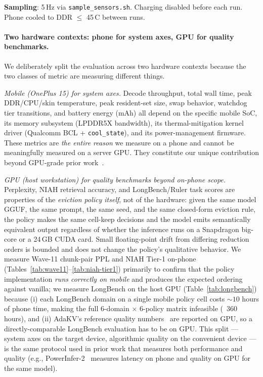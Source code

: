 \documentclass[sigconf, anonymous=false, screen=true]{acmart}
\begin{document}
\textbf{Sampling}: 5\,Hz via \texttt{sample\_sensors.sh}. Charging disabled before each run. Phone cooled to DDR $\le$ 45\,\textdegree C between runs.

\paragraph{Two hardware contexts: phone for system axes, GPU for quality benchmarks.}
We deliberately split the evaluation across two hardware contexts because the two classes of metric are measuring different things.

\noindent\emph{Mobile (OnePlus 15) for system axes.} Decode throughput, total wall time, peak DDR/CPU/skin temperature, peak resident-set size, swap behavior, watchdog tier transitions, and battery energy (mAh) all depend on the specific mobile SoC, its memory subsystem (LPDDR5X bandwidth), its thermal-mitigation kernel driver (Qualcomm BCL + \texttt{cool\_state}), and its power-management firmware. These metrics are \emph{the entire reason} we measure on a phone and cannot be meaningfully measured on a server GPU. They constitute our unique contribution beyond GPU-grade prior work~\cite{feng2025adakv, zhang2023h2o, oren2024tova, li2024snapkv, xiao2024streamingllm}.

\noindent\emph{GPU (host workstation) for quality benchmarks beyond on-phone scope.} Perplexity, NIAH retrieval accuracy, and LongBench/Ruler task scores are properties of the \emph{eviction policy itself}, not of the hardware: given the same model GGUF, the same prompt, the same seed, and the same closed-form eviction rule, the policy makes the same cell-keep decisions and the model emits semantically equivalent output regardless of whether the inference runs on a Snapdragon big-core or a 24\,GB CUDA card. Small floating-point drift from differing reduction orders is bounded and does not change the policy's qualitative behavior. We measure Wave-11 chunk-pair PPL and NIAH Tier-1 on-phone (Tables~\ref{tab:wave11}--\ref{tab:niah-tier1}) primarily to confirm that the policy implementation \emph{runs correctly on mobile} and produces the expected ordering against vanilla; we measure LongBench on the host GPU (Table~\ref{tab:longbench}) because (i) each LongBench domain on a single mobile policy cell costs $\sim 10$ hours of phone time, making the full 6-domain $\times$ 6-policy matrix infeasible (~$360$ hours), and (ii) AdaKV's reference quality numbers~\cite{feng2025adakv} are reported on GPU, so a directly-comparable LongBench evaluation has to be on GPU. This split — system axes on the target device, algorithmic quality on the convenient device — is the same protocol used in prior work that measures both performance and quality (e.g., PowerInfer-2~\cite{song2024powerinfer2} measures latency on phone and quality on GPU for the same model).
\end{document}
